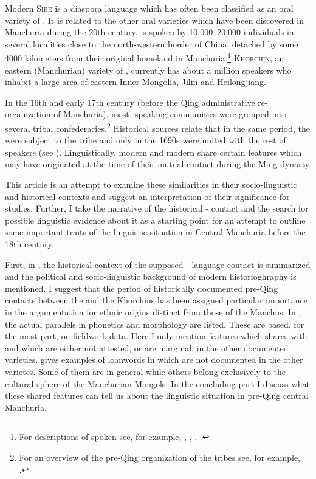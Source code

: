 \documentclass[output=paper,colorlinks,citecolor=brown]{langscibook}
\begin{document}
Modern \textsc{Sibe} is a  diaspora language which has often been classified as an oral variety of . It is related to the other oral  varieties which have been discovered in Manchuria during the 20th century.  is spoken by 10,000--20,000 individuals in several localities close to the north-western border of China, detached by some 4000 kilometers from their original homeland in Manchuria.\footnote{For descriptions of spoken  see, for example, \citet{Norman1974}, \citet{Jang2008}, \citet{Zikmundová2013b}, \citet{Kogura2018}.} \textsc{Khorchin}, an eastern (Manchurian) variety of , currently has about a million speakers who inhabit a large area of eastern Inner Mongolia, Jilin and Heilongjiang.

In the 16th and early 17th century (before the Qing administrative re-or\-ga\-ni\-za\-tion of Manchuria), most -speaking communities were grouped into several  tribal confederacies.\footnote{For an overview of the pre-Qing organization of the  tribes see, for example, \citet[98--100]{Janhunen1996}.} Historical sources relate that in the same period, the  were subject to the   tribe and only in the 1690s were united with the rest of  speakers (see ). Linguistically, modern  and modern  share certain features which may have originated at the time of their mutual contact during the Ming dynasty.

This article is an attempt to examine these similarities in their socio-linguistic and historical contexts and suggest an interpretation of their significance for  studies. Further, I take the narrative of the historical - contact and the search for possible linguistic evidence about it as a starting point for an attempt to outline some important traits of the linguistic situation in Central Manchuria before the 18th century.

First, in , the historical context of the supposed - language contact is summarized and the political and socio-linguistic background of modern  historioghraphy is mentioned. I suggest that the period of historically documented pre-Qing contacts between the  and the Khorchins has been assigned particular importance in the argumentation for ethnic origins distinct from those of the Manchus. In , the actual parallels in phonetics and morphology are listed. These are based, for the most part, on fieldwork data. Here I only mention features which  shares with  and which are either not attested, or are marginal, in the other documented  varieties.  gives examples of  loanwords in  which are not documented in the other  varietes. Some of them are  in general while others belong exclusively to the cultural sphere of the Manchurian Mongols. In the concluding part I discuss what these shared features can tell us about the linguistic situation in pre-Qing central Manchuria.
\end{document}
